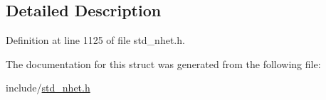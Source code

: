 \subsection{Detailed Description}


Definition at line 1125 of file std\+\_\+nhet.\+h.



The documentation for this struct was generated from the following file\+:\begin{DoxyCompactItemize}
\item 
include/\mbox{\hyperlink{std__nhet_8h}{std\+\_\+nhet.\+h}}\end{DoxyCompactItemize}
